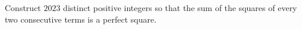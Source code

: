 Construct $2023$ distinct positive integers so that the sum of the squares of every two consecutive terms is a perfect square.
